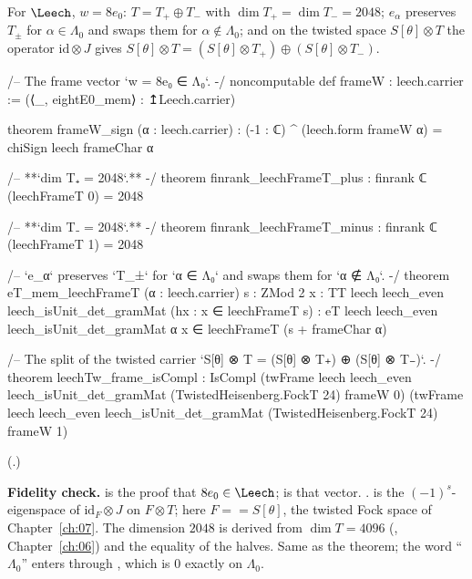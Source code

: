 \begin{theorem}\label{ch11:thm:leechT}
For $\Leech$, $w=8e_0$: $T=T_+\oplus T_-$ with $\dim T_+=\dim T_-=2048$; $e_\alpha$ preserves $T_\pm$
for $\alpha\in\Lambda_0$ and swaps them for $\alpha\notin\Lambda_0$; and on the twisted space
$S[\theta]\otimes T$ the operator $\mathrm{id}\otimes J$ gives
$S[\theta]\otimes T=(S[\theta]\otimes T_+)\oplus(S[\theta]\otimes T_-)$.
\end{theorem}
\begin{leancode}
/-- The frame vector `w = 8e₀ ∈ Λ₀`. -/
noncomputable def frameW : leech.carrier := (⟨_, eightE0_mem⟩ : ↥Leech.carrier)

theorem frameW_sign (α : leech.carrier) :
    (-1 : ℂ) ^ (leech.form frameW α) = chiSign leech frameChar α

/-- **`dim T₊ = 2048`.** -/
theorem finrank_leechFrameT_plus : finrank ℂ (leechFrameT 0) = 2048

/-- **`dim T₋ = 2048`.** -/
theorem finrank_leechFrameT_minus : finrank ℂ (leechFrameT 1) = 2048

/-- `e_α` preserves `T_±` for `α ∈ Λ₀` and swaps them for `α ∉ Λ₀`. -/
theorem eT_mem_leechFrameT (α : leech.carrier) {s : ZMod 2}
    {x : TT leech leech_even leech_isUnit_det_gramMat} (hx : x ∈ leechFrameT s) :
    eT leech leech_even leech_isUnit_det_gramMat α x ∈ leechFrameT (s + frameChar α)

/-- The split of the twisted carrier `S[θ] ⊗ T = (S[θ] ⊗ T₊) ⊕ (S[θ] ⊗ T₋)`. -/
theorem leechTw_frame_isCompl :
    IsCompl (twFrame leech leech_even leech_isUnit_det_gramMat (TwistedHeisenberg.FockT 24) frameW 0)
      (twFrame leech leech_even leech_isUnit_det_gramMat (TwistedHeisenberg.FockT 24) frameW 1)
\end{leancode}
(.)
\begin{dictionary}
\textbf{Fidelity check.}   is the proof that $8e_0\in\Leech$;  is
that vector.  .   is the
$(-1)^s$-eigenspace of $\mathrm{id}_F\otimes J$ on $F\otimes T$; here $F=$$=S[\theta]$,
the twisted Fock space of Chapter~\ref{ch:07}.  The dimension $2048$ is derived from
$\dim T=4096$ (, Chapter~\ref{ch:06}) and the equality of the halves.  Same as
the theorem; the word ``$\Lambda_0$'' enters through , which is $0$ exactly on
$\Lambda_0$.
\end{dictionary}

